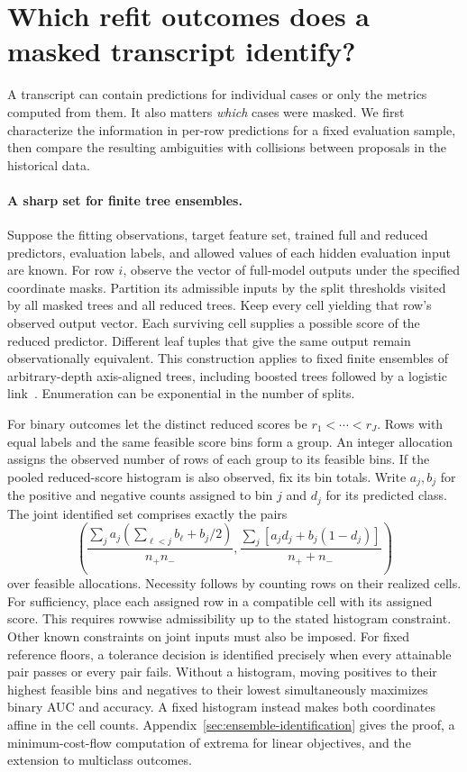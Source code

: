 \section{Which refit outcomes does a masked transcript identify?}
\label{sec:evidence}
A transcript can contain predictions for individual cases or only the metrics computed from them. It also matters \emph{which} cases were masked. We first characterize the information in per-row predictions for a fixed evaluation sample, then compare the resulting ambiguities with collisions between proposals in the historical data.

\paragraph{A sharp set for finite tree ensembles.}
Suppose the fitting observations, target feature set, trained full and reduced predictors, evaluation labels, and allowed values of each hidden evaluation input are known. For row $i$, observe the vector of full-model outputs under the specified coordinate masks. Partition its admissible inputs by the split thresholds visited by all masked trees and all reduced trees. Keep every cell yielding that row's observed output vector. Each surviving cell supplies a possible score of the reduced predictor. Different leaf tuples that give the same output remain observationally equivalent. This construction applies to fixed finite ensembles of arbitrary-depth axis-aligned trees, including boosted trees followed by a logistic link~\cite{misic2020ensemble}. Enumeration can be exponential in the number of splits.

For binary outcomes let the distinct reduced scores be $r_1<\cdots<r_J$. Rows with equal labels and the same feasible score bins form a group. An integer allocation assigns the observed number of rows of each group to its feasible bins. If the pooled reduced-score histogram is also observed, fix its bin totals. Write $a_j,b_j$ for the positive and negative counts assigned to bin $j$ and $d_j$ for its predicted class. The joint identified set comprises exactly the pairs
\begin{equation}
 \left(\frac{\sum_j a_j(\sum_{\ell<j} b_\ell+b_j/2)}{n_+n_-},
       \frac{\sum_j [a_jd_j+b_j(1-d_j)]}{n_++n_-}\right)
 \label{eq:main-tree-set}
\end{equation}
over feasible allocations. Necessity follows by counting rows on their realized cells. For sufficiency, place each assigned row in a compatible cell with its assigned score. This requires rowwise admissibility up to the stated histogram constraint. Other known constraints on joint inputs must also be imposed. For fixed reference floors, a tolerance decision is identified precisely when every attainable pair passes or every pair fails. Without a histogram, moving positives to their highest feasible bins and negatives to their lowest simultaneously maximizes binary AUC and accuracy. A fixed histogram instead makes both coordinates affine in the cell counts. Appendix~\ref{sec:ensemble-identification} gives the proof, a minimum-cost-flow computation of extrema for linear objectives, and the extension to multiclass outcomes.

